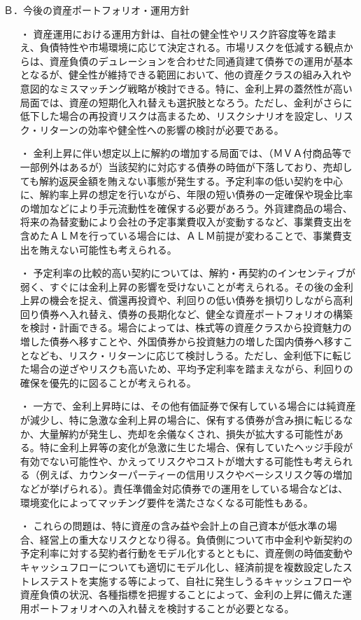 \documentclass[report,gutter=10mm,fore-edge=10mm,uplatex,dvipdfmx]{jlreq}
\begin{document}
Ｂ．今後の資産ポートフォリオ・運用方針

\begin{itemize}
 \item [・]  資産運用における運用方針は、自社の健全性やリスク許容度等を踏まえ、負債特性や市場環境に応じて決定される。市場リスクを低減する観点からは、資産負債のデュレーションを合わせた同通貨建て債券での運用が基本となるが、健全性が維持できる範囲において、他の資産クラスの組み入れや意図的なミスマッチング戦略が検討できる。特に、金利上昇の蓋然性が高い局面では、資産の短期化入れ替えも選択肢となろう。ただし、金利がさらに低下した場合の再投資リスクは高まるため、リスクシナリオを設定し、リスク・リターンの効率や健全性への影響の検討が必要である。
 \item [・]  金利上昇に伴い想定以上に解約の増加する局面では、（ＭＶＡ付商品等で一部例外はあるが）当該契約に対応する債券の時価が下落しており、売却しても解約返戻金額を賄えない事態が発生する。予定利率の低い契約を中心に、解約率上昇の想定を行いながら、年限の短い債券の一定確保や現金比率の増加などにより手元流動性を確保する必要があろう。外貨建商品の場合、将来の為替変動により会社の予定事業費収入が変動するなど、事業費支出を含めたＡＬＭを行っている場合には、ＡＬＭ前提が変わることで、事業費支出を賄えない可能性も考えられる。
 \item [・]  予定利率の比較的高い契約については、解約・再契約のインセンティブが弱く、すぐには金利上昇の影響を受けないことが考えられる。その後の金利上昇の機会を捉え、償還再投資や、利回りの低い債券を損切りしながら高利回り債券へ入れ替え、債券の長期化など、健全な資産ポートフォリオの構築を検討・計画できる。場合によっては、株式等の資産クラスから投資魅力の増した債券へ移すことや、外国債券から投資魅力の増した国内債券へ移すことなども、リスク・リターンに応じて検討しうる。ただし、金利低下に転じた場合の逆ざやリスクも高いため、平均予定利率を踏まえながら、利回りの確保を優先的に図ることが考えられる。
 \item [・]  一方で、金利上昇時には、その他有価証券で保有している場合には純資産が減少し、特に急激な金利上昇の場合に、保有する債券が含み損に転じるなか、大量解約が発生し、売却を余儀なくされ、損失が拡大する可能性がある。特に金利上昇等の変化が急激に生じた場合、保有していたヘッジ手段が有効でない可能性や、かえってリスクやコストが増大する可能性も考えられる（例えば、カウンターパーティーの信用リスクやベーシスリスク等の増加などが挙げられる）。責任準備金対応債券での運用をしている場合などは、環境変化によってマッチング要件を満たさなくなる可能性もある。
 \item [・]  これらの問題は、特に資産の含み益や会計上の自己資本が低水準の場合、経営上の重大なリスクとなり得る。負債側について市中金利や新契約の予定利率に対する契約者行動をモデル化するとともに、資産側の時価変動やキャッシュフローについても適切にモデル化し、経済前提を複数設定したストレステストを実施する等によって、自社に発生しうるキャッシュフローや資産負債の状況、各種指標を把握することによって、金利の上昇に備えた運用ポートフォリオへの入れ替えを検討することが必要となる。

\end{itemize}
\end{document}
